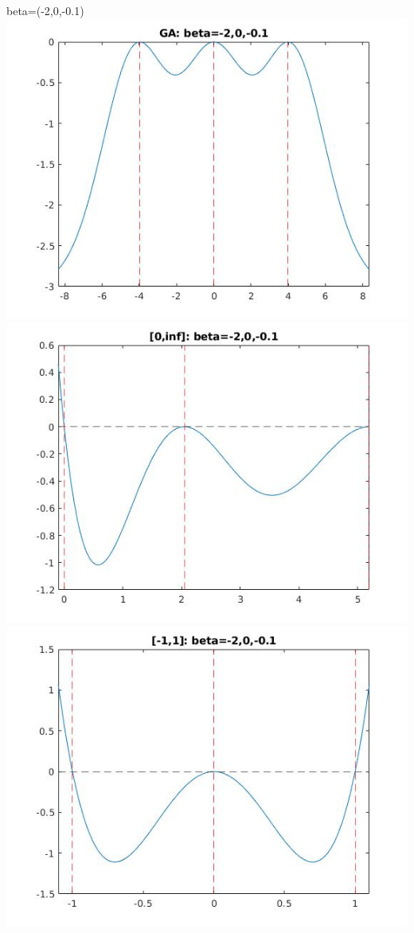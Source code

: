 \documentclass[11pt]{beamer}
\begin{document}
\begin{frame}{beta=(-2,0,-0.1)}
\includegraphics[scale=0.18]{quadplots/GA_3.jpg}
\includegraphics[scale=0.18]{quadplots/positive_3.jpg}
\includegraphics[scale=0.18]{quadplots/11_3.jpg}

\end{frame}
\end{document}
